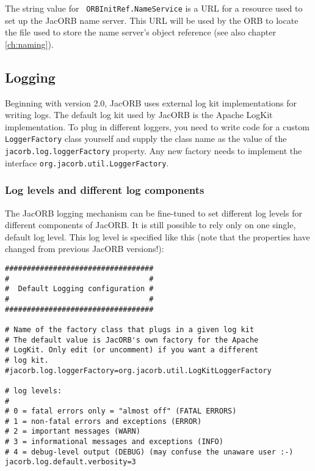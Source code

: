 The  string value  for  {\tt
ORBInitRef.NameService} is  a URL  for a resource  used to set  up the
JacORB name  server. This URL  will be used  by the ORB to  locate the
file  used to  store  the  name server's  object  reference (see  also
chapter \ref{ch:naming}).

\subsection{Logging}

Beginning with version 2.0, JacORB uses external log kit
implementations for writing logs. The default log kit used by JacORB
is the Apache LogKit implementation. To plug in different loggers, you
need to write code for a custom {\tt LoggerFactory} class yourself and
supply the class name as the value of the {\tt
  jacorb.log.loggerFactory} property. Any new factory needs to
implement the interface {\tt org.jacorb.util.LoggerFactory}.

\subsubsection*{Log levels and different log components}

The JacORB logging mechanism can be fine-tuned to set different log
levels for different components of JacORB. It is still possible to
rely only on one single, default log level. This log level is
specified like this (note that the properties have changed from
previous JacORB versions!):

\renewcommand{\baselinestretch}{0.9}
\small{
\begin{verbatim}
##################################
#                                #
#  Default Logging configuration #
#                                #
##################################

# Name of the factory class that plugs in a given log kit
# The default value is JacORB's own factory for the Apache 
# LogKit. Only edit (or uncomment) if you want a different 
# log kit.
#jacorb.log.loggerFactory=org.jacorb.util.LogKitLoggerFactory

# log levels:
#
# 0 = fatal errors only = "almost off" (FATAL ERRORS)
# 1 = non-fatal errors and exceptions (ERROR)
# 2 = important messages (WARN)
# 3 = informational messages and exceptions (INFO)
# 4 = debug-level output (DEBUG) (may confuse the unaware user :-)
jacorb.log.default.verbosity=3
\end{verbatim}
}
\renewcommand{\baselinestretch}{1.0}
\small\normalsize

